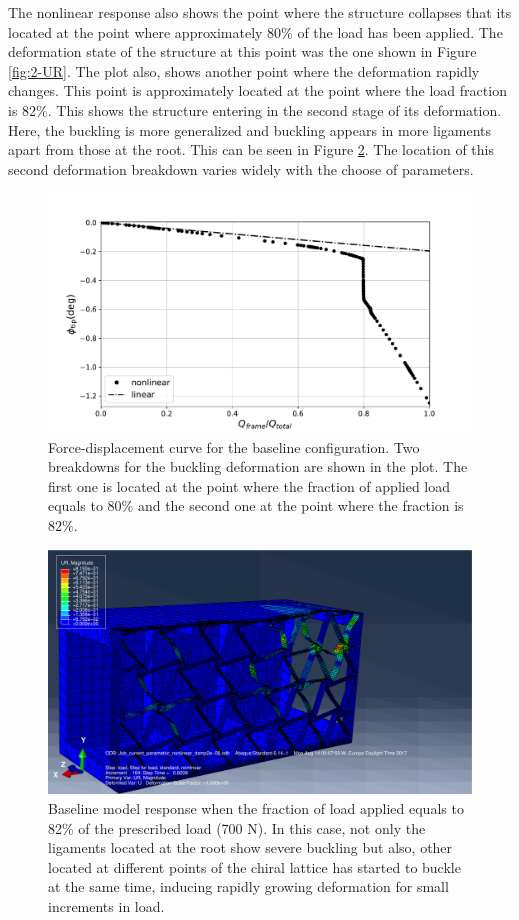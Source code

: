   The nonlinear response also shows the point where the structure collapses that its located at the point where approximately $80\%$ of the load has been applied. The deformation state of the structure at this point was the one shown in Figure \ref{fig:2-UR}. The plot also, shows another point where the deformation rapidly changes. This point is approximately located at the point where the load fraction is $82\%$. This shows the structure entering in the second stage of its deformation. Here, the buckling is more generalized and buckling appears in more ligaments apart from those at the root. This can be seen in Figure \ref{fig:3-UR}. The location of this second deformation breakdown varies widely with the choose of parameters.

  \begin{figure}[!htpb] %
    \centering
    \includegraphics[width=0.8 \textwidth]{../figures/result-sim/forceDisplacement-far}
    \caption[Force-displacement curve for the baseline configuration]{Force-displacement curve for the baseline configuration. Two breakdowns for the buckling deformation are shown in the plot. The first one is located at the point where the fraction of applied load equals to $80\%$ and the second one at the point where the fraction is $82\%$.}\label{fig:forceDisplacement-far}
  \end{figure}

  \begin{figure}[!htpb] %
    \centering
    \includegraphics[width=0.8 \textwidth]{../figures/result-sim/3-UR}
    \caption[Baseline model response when the fraction of load applied equals to 82\% of the prescribed load (700 N)]{Baseline model response when the fraction of load applied equals to 82\% of the prescribed load (700 N). In this case, not only the ligaments located at the root show severe buckling but also, other located at different points of the chiral lattice has started to buckle at the same time, inducing rapidly growing deformation for small increments in load.}\label{fig:3-UR}
  \end{figure}
  
